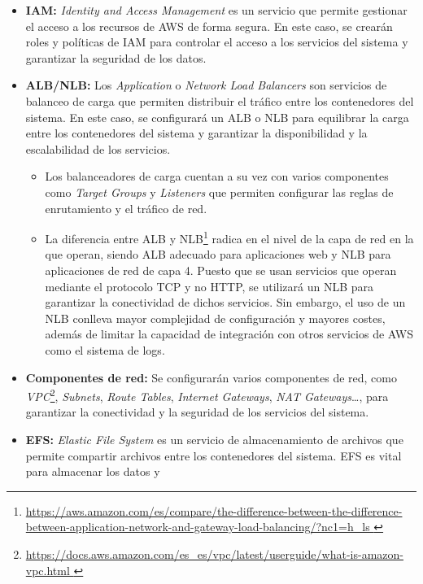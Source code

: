 \begin{itemize}
	\item \textbf{IAM:} \textit{Identity and Access Management} es un servicio
		que permite gestionar el acceso a los recursos de AWS de forma segura.
		En este caso, se crearán roles y políticas de IAM para controlar el
		acceso a los servicios del sistema y garantizar la seguridad de los
		datos.
	\item \textbf{ALB/NLB:} Los \textit{Application} o \textit{Network Load
		Balancers} son servicios de balanceo de carga que permiten distribuir
		el tráfico entre los contenedores del sistema. En este caso, se
		configurará un ALB o NLB para equilibrar la carga entre los contenedores
		del sistema y garantizar la disponibilidad y la escalabilidad de los
		servicios. \begin{itemize}
			\item Los balanceadores de carga cuentan a su vez con varios
				componentes como \textit{Target Groups} y \textit{Listeners} que
				permiten configurar las reglas de enrutamiento y el tráfico de
				red.
			\item La diferencia entre ALB y NLB\footnote{\url{
					https://aws.amazon.com/es/compare/the-difference-between-the-difference-between-application-network-and-gateway-load-balancing/?nc1=h_ls
				}} radica en el nivel de la capa de red en la que operan, siendo
				ALB adecuado para aplicaciones web y NLB para aplicaciones de
				red de capa 4. Puesto que se usan servicios que operan
				mediante el protocolo TCP y no HTTP, se utilizará un NLB para
				garantizar la conectividad de dichos servicios. Sin embargo, el
				uso de un NLB conlleva mayor complejidad de configuración y
				mayores costes, además de limitar la capacidad de integración
				con otros servicios de AWS como el sistema de logs.
		\end{itemize}
	\item \textbf{Componentes de red:} Se configurarán varios componentes de
		red, como \textit{VPC}\footnote{\url{
			https://docs.aws.amazon.com/es_es/vpc/latest/userguide/what-is-amazon-vpc.html
		}}, \textit{Subnets}, \textit{Route Tables},
		\textit{Internet Gateways}, \textit{NAT Gateways}\ldots, para garantizar
		la conectividad y la seguridad de los servicios del sistema.
	\item \textbf{EFS:} \textit{Elastic File System} es un servicio de
		almacenamiento de archivos que permite compartir archivos entre los
		contenedores del sistema. EFS es vital para almacenar los datos y

\end{itemize}
